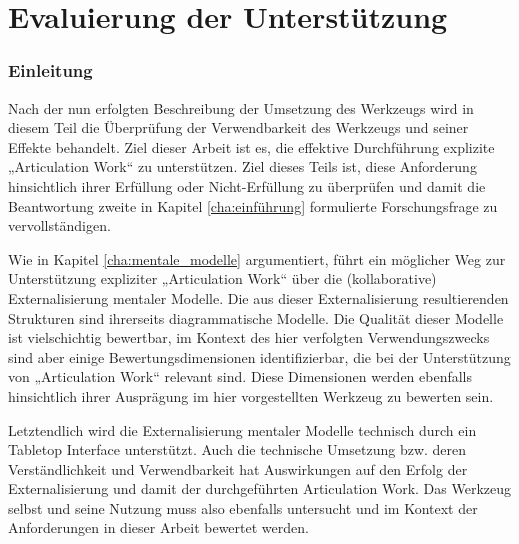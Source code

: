 \part{Evaluierung der Unterstützung} %
\label{prt:evaluierung}

\section*{Einleitung} %
\label{sec:evaluierung_einleitung}
\thispagestyle{empty}


Nach der nun erfolgten Beschreibung der Umsetzung des Werkzeugs wird in diesem Teil die Überprüfung der Verwendbarkeit des Werkzeugs und seiner Effekte behandelt. Ziel dieser Arbeit ist es, die effektive Durchführung explizite „Articulation Work“ zu unterstützen. Ziel dieses Teils ist, diese Anforderung hinsichtlich ihrer Erfüllung oder Nicht-Erfüllung zu überprüfen und damit die Beantwortung zweite in Kapitel \ref{cha:einführung} formulierte Forschungsfrage zu vervollständigen.

Wie in Kapitel \ref{cha:mentale_modelle} argumentiert, führt ein möglicher Weg zur Unterstützung expliziter „Articulation Work“ über die (kollaborative) Externalisierung mentaler Modelle. Die aus dieser Externalisierung resultierenden Strukturen sind ihrerseits diagrammatische Modelle. Die Qualität dieser Modelle ist vielschichtig bewertbar, im Kontext des hier verfolgten Verwendungszwecks sind aber einige Bewertungsdimensionen identifizierbar, die bei der Unterstützung von „Articulation Work“ relevant sind. Diese Dimensionen werden ebenfalls hinsichtlich ihrer Ausprägung im hier vorgestellten Werkzeug zu bewerten sein. 

Letztendlich wird die Externalisierung mentaler Modelle technisch durch ein Tabletop Interface unterstützt. Auch die technische Umsetzung bzw. deren Verständlichkeit und Verwendbarkeit hat Auswirkungen auf den Erfolg der Externalisierung und damit der durchgeführten Articulation Work. Das Werkzeug selbst und seine Nutzung muss also ebenfalls untersucht und im Kontext der Anforderungen in dieser Arbeit bewertet werden. 

